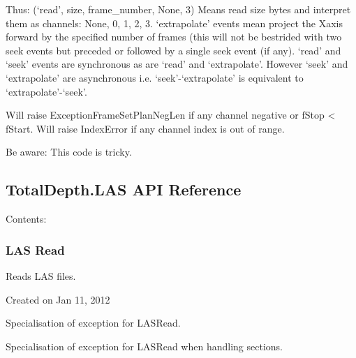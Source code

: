 \documentclass[letterpaper,10pt,english]{sphinxmanual}
\begin{document}
\begin{fulllineitems}
\begin{fulllineitems}
Thus: (‘read’, size, frame\_number, None, 3)
Means read size bytes and interpret them as channels: None, 0, 1, 2, 3.
‘extrapolate’ events mean project the Xaxis forward by the specified
number of frames (this will not be bestrided with two seek events but
preceded or followed by a single seek event (if any). ‘read’ and ‘seek’
events are synchronous as are ‘read’ and ‘extrapolate’. However ‘seek’
and ‘extrapolate’ are asynchronous i.e. ‘seek’-‘extrapolate’ is
equivalent to ‘extrapolate’-‘seek’.

Will raise ExceptionFrameSetPlanNegLen if any channel negative or fStop \textless{} fStart.
Will raise IndexError if any channel index is out of range.

Be aware: This code is tricky.

\end{fulllineitems}


\end{fulllineitems}



\subsection{TotalDepth.LAS API Reference}
\label{\detokenize{ref/LAS/index_LAS::doc}}\label{\detokenize{ref/LAS/index_LAS:totaldepth-las-api-reference}}
Contents:


\subsubsection{LAS Read}
\label{\detokenize{ref/LAS/core/LASRead:las-read}}\label{\detokenize{ref/LAS/core/LASRead::doc}}\label{\detokenize{ref/LAS/core/LASRead:module-TotalDepth.LAS.core.LASRead}}
Reads LAS files.

Created on Jan 11, 2012

\begin{fulllineitems}
\label{\detokenize{ref/LAS/core/LASRead:TotalDepth.LAS.core.LASRead.ExceptionLASRead}}
Specialisation of exception for LASRead.

\end{fulllineitems}


\begin{fulllineitems}
\label{\detokenize{ref/LAS/core/LASRead:TotalDepth.LAS.core.LASRead.ExceptionLASReadSection}}
Specialisation of exception for LASRead when handling sections.

\end{fulllineitems}
\end{document}

